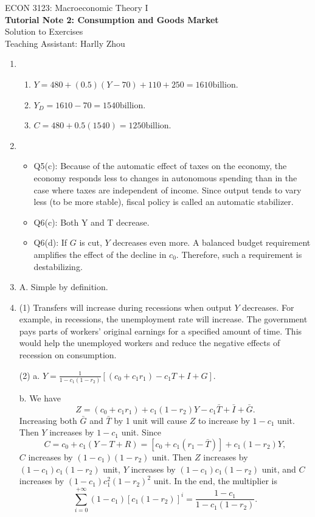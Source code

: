 \documentclass[12pt]{article}
\numberwithin{equation}{section}
\begin{document}
\begin{center}
    ECON 3123: Macroeconomic Theory I\\
    {\large \textbf{Tutorial Note 2: Consumption and Goods Market}}\\
    Solution to Exercises\\
    Teaching Assistant: Harlly Zhou
\end{center}

\begin{enumerate}[label=\arabic*.]
    \item \begin{enumerate}[label=\alph*.]
        \item $Y=480+(0.5)(Y-70)+110+250=1610\text{billion}$.
        \item $Y_D = 1610 - 70 = 1540\text{billion}$.
        \item $C = 480 + 0.5(1540) = 1250 \text{billion}$.
        \end{enumerate}
    \item \begin{itemize}
        \item Q5(c): Because of the automatic effect of taxes on the economy, the economy responds less to changes in autonomous spending than in the case where taxes are independent of income. Since output tends to vary less (to be more stable), fiscal policy is called an automatic stabilizer.
        \item Q6(c): Both Y and T decrease.
        \item Q6(d): If $G$ is cut, $Y$ decreases even more. A balanced budget requirement amplifies the effect of the decline in $c_0$. Therefore, such a requirement is destabilizing.
        \end{itemize}
    \item A. Simple by definition.
    \item (1) Transfers will increase during recessions when output $Y$ decreases. For example, in recessions, the unemployment rate will increase. The government pays parts of workers' original earnings for a specified amount of time. This would help the unemployed workers and reduce the negative effects of recession on consumption.

    (2) a. $Y = \frac{1}{1-c_1(1-r_2)}[(c_0+c_1r_1) - c_1 T + I + G]$.

    b. We have
    \[Z = (c_0 + c_1 r_1) + c_1(1-r_2) Y - c_1\bar{T} + \bar{I} + \bar{G}.\]
    Increasing both $\bar{G}$ and $\bar{T}$ by 1 unit will cause $Z$ to increase by $1-c_1$ unit. Then $Y$ increases by $1-c_1$ unit. Since
    \[C = c_0 + c_1(Y - T + R) = [c_0 + c_1(r_1 - \bar{T})] + c_1(1 - r_2) Y,\]
    $C$ increases by $(1-c_1)(1-r_2)$ unit. Then $Z$ increases by $(1-c_1)c_1(1-r_2)$ unit, $Y$ increases by $(1-c_1)c_1(1-r_2)$ unit, and $C$ increases by $(1-c_1)c_1^2(1-r_2)^2$ unit. In the end, the multiplier is
    \[\sum_{i=0}^{+\infty} (1-c_1)[c_1(1-r_2)]^i = \frac{1-c_1}{1-c_1(1-r_2)}.\]
    

\end{enumerate}
\end{document}
